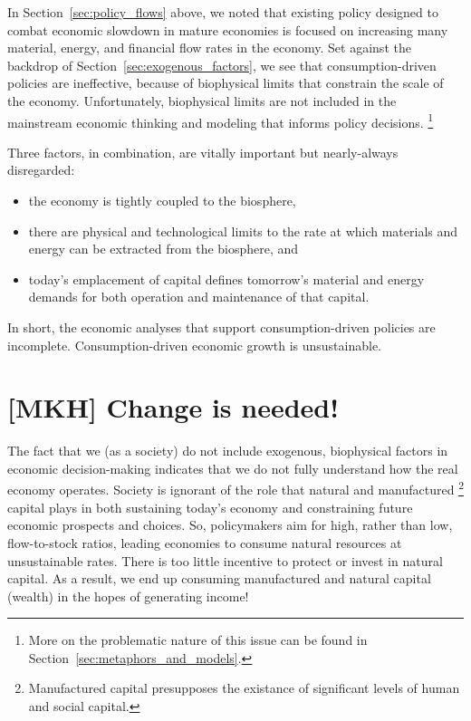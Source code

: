 In Section~\ref{sec:policy_flows} above, 
we noted that existing policy designed to combat economic slowdown 
in mature economies is focused on 
increasing many material, energy, and financial flow rates in the economy.
Set against the backdrop of Section~\ref{sec:exogenous_factors},
we see that consumption-driven policies are ineffective,
because of biophysical limits that constrain the scale of the economy. 
Unfortunately, biophysical limits 
are not included in the mainstream economic thinking and modeling
that informs policy decisions.%
	\footnote{
	More on the problematic nature of this issue
	can be found in Section~\ref{sec:metaphors_and_models}.
	}

Three factors, in combination, are vitally important 
but nearly-always disregarded:

\begin{itemize}
	\item{the economy is tightly coupled to the biosphere,}
	\item{there are physical and technological limits 
			to the rate at which materials and energy can be extracted 
			from the biosphere, and}
	\item{today’s emplacement of capital defines
			tomorrow’s material and energy demands 
			for both operation and maintenance of that capital.}
\end{itemize}

In short, the economic analyses that support 
consumption-driven policies are incomplete.
Consumption-driven economic growth is unsustainable.


\section{[MKH] Change is needed!}
\label{sec:change_needed}

The fact that we (as a society) do not include exogenous, biophysical factors 
in economic decision-making indicates that
we do not fully understand how the real economy operates.
Society is ignorant of the role that natural and manufactured%
	\footnote{
	Manufactured capital presupposes the existance of 
	significant levels of human and social capital.
	}
capital plays in both sustaining today’s economy and 
constraining future economic prospects and choices.
So, policymakers aim for high, rather than low, flow-to-stock ratios,
leading economies to consume natural resources at unsustainable rates.
There is too little incentive to protect or invest in natural capital. 
As a result, we end up consuming manufactured and natural capital (wealth) 
in the hopes of generating income!

